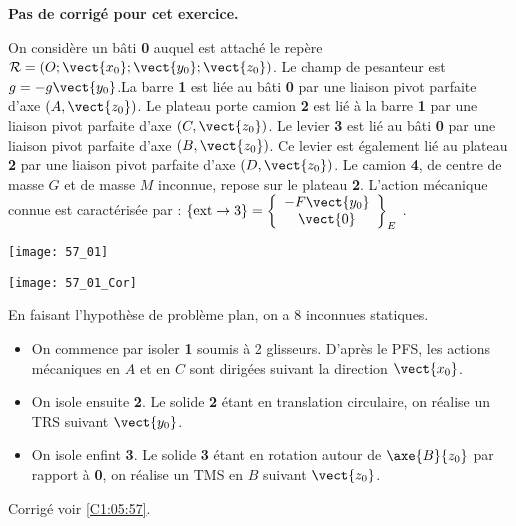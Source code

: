 \normalfalse \difficiletrue \tdifficilefalse
\correctiontrue


\setcounter{question}{0}
\ifcorrection
\else
\textbf{Pas de corrigé pour cet exercice.}
\fi

\ifprof
\else
On considère un bâti \textbf{0} auquel est attaché le repère$\mathcal{R}=\left(O;\vect{x_0};\vect{y_0};\vect{z_0} \right)$. Le champ de pesanteur est $g=-g\vect{y_0}$.La barre \textbf{1} est liée au bâti \textbf{0} par une liaison pivot parfaite d’axe $\left(A,\vect{z_0}\right)$. Le plateau porte camion \textbf{2} est lié à la barre \textbf{1} par une liaison pivot parfaite d’axe $\left(C,\vect{z_0}\right)$. Le levier \textbf{3} est lié au bâti \textbf{0} par une liaison pivot parfaite d’axe $\left(B,\vect{z_0}\right)$. Ce levier est également lié au plateau \textbf{2} par une liaison pivot parfaite d’axe $\left(D,\vect{z_0}\right)$. Le camion \textbf{4}, de centre de masse $G$ et de masse $M$ inconnue, repose sur le plateau \textbf{2}.
L’action mécanique connue est caractérisée par : $\{\text{ext}\rightarrow 3\}=\left\{
\begin{array}{c}
-F\vect{y_0} \\
\vect{0} \\
\end{array}
\right\}_E$ .


\begin{center}
\texttt{[image: 57\_01]}
\end{center}


\fi

\ifprof

\begin{center}
\texttt{[image: 57\_01\_Cor]}
\end{center}

En faisant l'hypothèse de problème plan, on a 8 inconnues statiques. 
\else
\fi



\ifprof
\begin{itemize}
\item On commence par isoler \textbf{1} soumis à 2 glisseurs. D'après le PFS, les actions mécaniques en $A$ et en $C$ sont dirigées suivant la direction $\vect{x_0}$.
\item On isole ensuite \textbf{2}. Le solide \textbf{2} étant en translation circulaire, on réalise un TRS suivant $\vect{y_0}$. 
\item On isole enfint \textbf{3}. Le solide \textbf{3} étant en rotation autour de $\axe{B}{z_0}$ par rapport à \textbf{0},  on réalise un TMS en $B$ suivant $\vect{z_0}$. 
\end{itemize}
\else
\fi
\ifprof
\else
\begin{flushright}
\footnotesize{Corrigé  voir \ref{C1:05:57}.}
\end{flushright}%
\fi